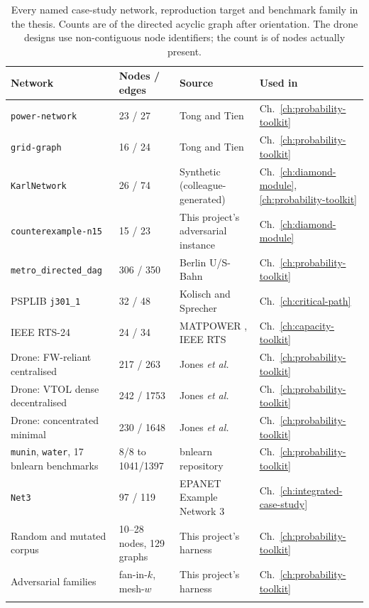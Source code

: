 \documentclass[12pt]{report}
\providecommand{\filepath}[1]{\nolinkurl{#1}}
\begin{document}
{\footnotesize
\begin{longtable}{@{}p{3.1cm} l p{3.3cm} l@{}}
\toprule
Network & Nodes / edges & Source & Used in \\
\midrule
\endhead
\texttt{power-network}        & 23 / 27   & Tong and Tien \cite{tong2019directed}      & Ch.~\ref{ch:probability-toolkit} \\
\texttt{grid-graph}           & 16 / 24   & Tong and Tien \cite{tong2019directed}      & Ch.~\ref{ch:probability-toolkit} \\
\texttt{KarlNetwork}          & 26 / 74   & Synthetic (colleague-generated)            & Ch.~\ref{ch:diamond-module}, \ref{ch:probability-toolkit} \\
\texttt{counterexample-n15}   & 15 / 23   & This project's adversarial instance       & Ch.~\ref{ch:diamond-module} \\
\filepath{metro_directed_dag} & 306 / 350 & Berlin U/S-Bahn \cite{behrensdorf2021numerically} & Ch.~\ref{ch:probability-toolkit} \\
PSPLIB \filepath{j301_1}       & 32 / 48   & Kolisch and Sprecher \cite{kolisch1997psplib} & Ch.~\ref{ch:critical-path} \\
IEEE RTS-24                   & 24 / 34   & MATPOWER \cite{zimmerman2011matpower}, IEEE RTS \cite{ieee1979rts} & Ch.~\ref{ch:capacity-toolkit} \\
Drone: FW-reliant centralised & 217 / 263 & Jones \emph{et al.} \cite{jones2025conceptual} & Ch.~\ref{ch:probability-toolkit} \\
Drone: VTOL dense decentralised & 242 / 1753 & Jones \emph{et al.} \cite{jones2025conceptual} & Ch.~\ref{ch:probability-toolkit} \\
Drone: concentrated minimal   & 230 / 1648 & Jones \emph{et al.} \cite{jones2025conceptual} & Ch.~\ref{ch:probability-toolkit} \\
\texttt{munin}, \texttt{water}, 17 bnlearn benchmarks & 8/8 to 1041/1397 & bnlearn repository \cite{scutari2010bnlearn} & Ch.~\ref{ch:probability-toolkit} \\
\texttt{Net3}                 & 97 / 119  & EPANET Example Network 3 \cite{rossman2000epanet2} & Ch.~\ref{ch:integrated-case-study} \\
Random and mutated corpus     & 10--28 nodes, 129 graphs & This project's harness & Ch.~\ref{ch:probability-toolkit} \\
Adversarial families          & fan-in-$k$, mesh-$w$ & This project's harness & Ch.~\ref{ch:probability-toolkit} \\
\bottomrule
\caption{Every named case-study network, reproduction target and benchmark family in the
thesis. Counts are of the directed acyclic graph after orientation. The drone designs use
non-contiguous node identifiers; the count is of nodes actually present.}
\label{tab:appA-glance}
\end{longtable}}
\end{document}
